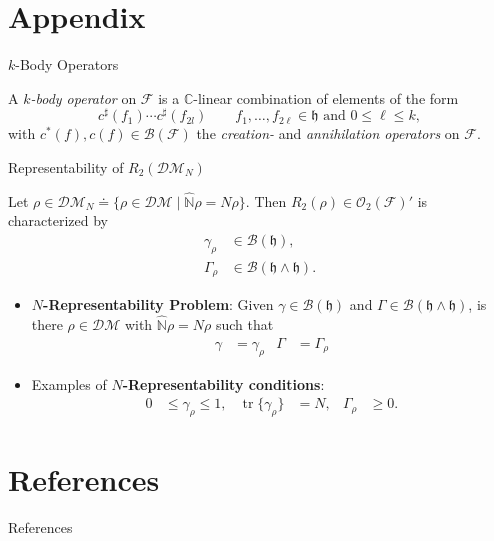 \documentclass{beamer}
\DeclareMathOperator{\tr}{tr}
\newcommand{\IN}{\ensuremath{\mathbb{N}}}
\newcommand{\IC}{\ensuremath{\mathbb{C}}}
\newcommand{\HilbertSpace}{\ensuremath{\mathfrak{h}}}
\newcommand{\FockSpace}{\mathcal{F}}
\newcommand{\DensityMatrices}{\mathcal{DM}}
\newcommand{\kbOp}[1][k]{{\ensuremath{\mathcal{O}_{#1}(\mathcal{F})}}}
\begin{document}
\section{Appendix}
\frame{\sectionpage}

\begin{frame}{$k$-Body Operators}
\begin{definition}
    A \emph{$k$-body operator} on $\FockSpace$ is a $\IC$-linear
    combination of elements of the form
    \begin{equation}
        c^\sharp(f_1)\cdots c^\sharp(f_{2l})\qquad f_1,\ldots,f_{2\ell}\in\HilbertSpace
        \text{ and }0\le \ell\le k,
    \end{equation}
    with $c^*(f),c(f)\in\mathcal{B}(\FockSpace)$ the \emph{creation-} and \emph{annihilation operators} on $\FockSpace$.
\end{definition}
\end{frame}

\begin{frame}{Representability of $R_2(\DensityMatrices_N)$}
    \begin{exampleblock}{}
        Let $\rho\in\DensityMatrices_N\doteq\{\rho\in\DensityMatrices\mid\hat{\IN}\rho=N\rho\}$. Then $R_2(\rho)\in\kbOp[2]'$
        is characterized by
        \begin{align}
            \gamma_\rho&\in\mathcal{B}(\HilbertSpace),\tag{1-RDM}\\
            \Gamma_\rho&\in\mathcal{B}(\HilbertSpace\wedge\HilbertSpace).\tag{2-RDM}
        \end{align}
    \end{exampleblock}
    \begin{itemize}
        \item \textbf{$N$-Representability Problem}: Given $\gamma\in\mathcal{B}(\HilbertSpace)$
        and $\Gamma\in\mathcal{B}(\HilbertSpace\wedge\HilbertSpace)$,  is there $\rho\in\DensityMatrices$ with $\hat{\IN}\rho=N\rho$ such that
            \begin{align}
                \gamma&=\gamma_\rho&\Gamma&=\Gamma_\rho
            \end{align}
        \item Examples of \textbf{$N$-Representability conditions}:
        \begin{equation}
            \begin{aligned}
                0&\le\gamma_\rho\le 1,&
                \tr\{\gamma_\rho\}&=N,&
                \Gamma_\rho&\ge 0.
            \end{aligned}
        \end{equation}
    \end{itemize}
\end{frame}

\section*{References}
\begin{frame}{References}
    \nocite{*}
    \printbibliography
\end{frame}
\end{document}
